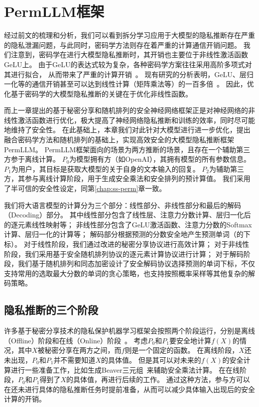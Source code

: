 \section{PermLLM框架}
经过前文的梳理和分析，我们可以看到拆分学习应用于大模型的隐私推断存在严重的隐私泄漏问题，与此同时，密码学方法则存在着严重的计算通信开销问题。
%
我们注意到，密码学在进行大模型隐私推断时，其开销也主要位于非线性激活函数GeLU上。
由于GeLU的表达式较为复杂，各种密码学方案往往采用高阶多项式对其进行拟合，
从而带来了严重的计算开销~\cite{hou2023ciphergpt,lu2023bumblebee,dong2023puma,pang_2024_bolt_transformer}。
%
现有研究的分析表明，GeLU、层归一化等的通信开销甚至可以达到线性计算（矩阵乘法等）的一百多倍~\cite{pang_2024_bolt_transformer}。
%
因此，优化基于密码学的大模型隐私推断的关键在于优化非线性函数。
%
%

而上一章提出的基于秘密分享和随机排列的安全神经网络框架正是对神经网络的非线性激活函数进行优化，极大提高了神经网络隐私推断和训练的效率，同时尽可能地维持了安全性。
%
在此基础上，本章我们对此针对大模型进行进一步优化，提出融合密码学方法和随机排列的基础上，实现高效安全的大模型隐私推断框架PermLLM。
%
PermLLM框架面向的场景为两方推断的场景，且存在一个辅助第三方参于离线计算。
%
$P_0$为模型拥有方（如OpenAI），其拥有模型的所有参数信息。
%
$P_1$为用户，其目标是获取大模型的关于自身的文本输入的回复。
%
$P_2$为辅助第三方，其参与离线计算阶段，用于生成安全乘法和安全排列的预计算值。
%
我们采用了半可信的安全性设定，同第\ref{chap:ss-perm}章一致。


我们将大语言模型的计算分为三个部分：线性部分、非线性部分和最后的解码（Decoding）部分。
其中线性部分包含了线性层、注意力分数计算、层归一化后的逐元素线性映射等；
非线性部分包含了GeLU激活函数、注意力分数的Softmax计算、层归一化的计算等；
解码部分根据预测的分数安全地产生预测单词（的下标）。
%
对于线性阶段，我们通过改进的秘密分享协议进行高效计算；
对于非线性阶段，我们采用基于安全随机排列协议的逐元素计算协议进行计算；
对于解码阶段，我们基于随机排列和同态加密设计了安全解码协议选择预测的单词下标，不仅支持常用的选取最大分数的单词的贪心策略，也支持按照概率采样等其他复杂的解码策略。
%


\subsection{隐私推断的三个阶段}
许多基于秘密分享技术的隐私保护机器学习框架会按照两个阶段运行，分别是离线（Offline）阶段和在线（Online）阶段~\cite{mohassel2017secureml,riazi_2018_chameleon}。
%
考虑$P_0$和$P_1$要安全地计算$f(X)$的情况，其中$X$被秘密分享在两方之间，而$f$则是一个固定的函数。
%
在离线阶段，$X$还未出现，$P_0$和$P_1$并不需要知道$X$的具体值。
%
但是其可以对未来的$f(X)$的安全计算进行一些准备工作，比如生成Beaver三元组~\cite{beaver1992efficient}来辅助安全乘法计算。
%
在在线阶段，$P_0$和$P_1$得到了$X$的具体值，再进行后续的工作。
通过这种方法，参与方可以在还未进行具体的隐私推断任务时提前准备，从而可以减少具体输入出现后的安全计算的开销。

